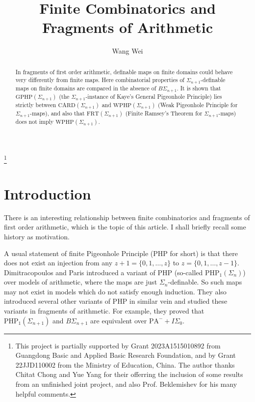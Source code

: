\documentclass[twoside,a4paper]{amsart}
\theoremstyle{definition}
\theoremstyle{theorem}
\numberwithin{equation}{section}
\newcommand{\<}{\langle}
\renewcommand{\>}{\rangle}
\newcommand{\PA}{\mathrm{PA}}
\newcommand{\CARD}{\mathrm{CARD}}
\newcommand{\WPHP}{\mathrm{WPHP}}
\newcommand{\GPHP}{\mathrm{GPHP}}
\newcommand{\PHP}{\mathrm{PHP}}
\newcommand{\FRT}{\mathrm{FRT}}
\begin{document}
\title{Finite Combinatorics and Fragments of Arithmetic}

\begin{abstract}
In fragments of first order arithmetic, definable maps on finite domains could behave very differently from finite maps.
Here combinatorial properties of $\Sigma_{n+1}$-definable maps on finite domains are compared in the absence of $B\Sigma_{n+1}$.
It is shown that $\GPHP(\Sigma_{n+1})$ (the $\Sigma_{n+1}$-instance of Kaye's General Pigeonhole Principle) lies strictly between $\CARD(\Sigma_{n+1})$ and $\WPHP(\Sigma_{n+1})$ (Weak Pigeonhole Principle for $\Sigma_{n+1}$-maps), and also that $\FRT(\Sigma_{n+1})$ (Finite Ramsey's Theorem for $\Sigma_{n+1}$-maps) does not imply $\WPHP(\Sigma_{n+1})$.
\end{abstract}


\author{Wang Wei}

\address{Institute of Logic and Cognition and Department of Philosophy\\
Sun Yat-Sen University\\
Guangzhou, China}

\thanks{This project is partially supported by Grant 2023A1515010892 from Guangdong Basic and Applied Basic Research Foundation, 
and by Grant 22JJD110002 from the Ministry of Education, China.
The author thanks Chitat Chong and Yue Yang for their offerring the inclusion of some results from an unfinished joint project, and also Prof. Beklemishev for his many helpful comments.}

\maketitle

\section{Introduction}\label{s:Introduction}

There is an interesting relationship between finite combinatorics and fragments of first order arithmetic,
which is the topic of this article.
I shall briefly recall some history as motivation.

A usual statement of finite Pigeonhole Principle (PHP for short) is that there does not exist an injection from any
$z+1 = \{0,1,\ldots,z\}$ to $z = \{0,1,\ldots,z-1\}$.
Dimitracopoulos and Paris \cite{Dimitracopoulos.Paris:1986} introduced a variant of PHP (so-called $\PHP_1(\Sigma_n)$) over models of arithmetic, where the maps are just $\Sigma_n$-definable. So such maps may not exist in models which do not satisfy enough induction. They also introduced several other variants of PHP in similar vein and studied these variants in fragments of arithmetic. For example, they proved that $\PHP_1(\Sigma_{n+1})$ and $B\Sigma_{n+1}$ are equivalent over $\PA^- + I\Sigma_0$.
\end{document}
